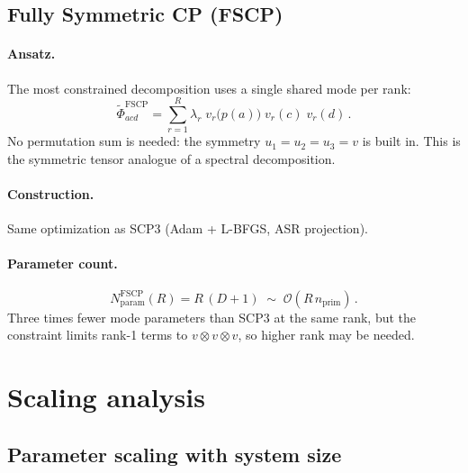 \documentclass[11pt]{article}
\newcommand{\nprim}{n_{\mathrm{prim}}}
\newcommand{\cO}{\mathcal{O}}
\begin{document}
\subsection{Fully Symmetric CP (FSCP)}
\label{sec:fscp}

\paragraph{Ansatz.}
The most constrained decomposition uses a single shared mode per rank:
\begin{equation}\label{eq:fscp}
  \boxed{
    \tilde\Phi_{acd}^{\mathrm{FSCP}}
    = \sum_{r=1}^{R} \lambda_r\;
      v_r\!\bigl(p(a)\bigr)\; v_r(c)\; v_r(d)\,.
  }
\end{equation}
No permutation sum is needed: the symmetry
$u_1 = u_2 = u_3 = v$ is built in.  This is the symmetric tensor
analogue of a spectral decomposition.

\paragraph{Construction.}
Same optimization as SCP3 (Adam + L-BFGS, ASR projection).

\paragraph{Parameter count.}
\begin{equation}\label{eq:fscp-params}
  N_{\mathrm{param}}^{\mathrm{FSCP}}(R) = R\,(D + 1)
  \;\sim\; \cO(R\,\nprim)\,.
\end{equation}
Three times fewer mode parameters than SCP3 at the same rank, but the
constraint limits rank-1 terms to $v \otimes v \otimes v$, so higher
rank may be needed.


\section{Scaling analysis}
\label{sec:scaling}

\subsection{Parameter scaling with system size}
\label{sec:param_scaling}
\end{document}
